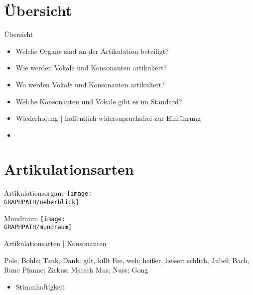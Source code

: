 \section{Übersicht}

\begin{frame}
  {Übersicht}
  \pause
  \begin{itemize}[<+->]
    \item Welche \alert{Organe} sind an der Artikulation beteiligt?
    \item \alert{Wie} werden Vokale und Konsonanten artikuliert?
    \item \alert{Wo} werden Vokale und Konsonanten artikuliert?
    \item Welche Konsonanten und Vokale gibt es im \alert{Standard}?
      \Zeile
    \item Wiederholung | hoffentlich widersupruchsfrei zur Einführung 
    \item \citet[Kap.~4]{Schaefer2018b}
  \end{itemize}
\end{frame}

\section{Artikulationsarten}

\begin{frame}
  {Artikulationsorgane}
  \pause
  \centering
  \texttt{[image: \\GRAPHPATH/ueberblick]}
\end{frame}

\begin{frame}
  {Mundraum}
  \pause
  \centering
  \texttt{[image: \\GRAPHPATH/mundraum]}
\end{frame}

\begin{frame}
  {Artikulationsarten | Konsonanten}
  \pause
    \begin{exe}
      \ex \alert{P}ole, \alert{B}ohle; \alert{T}ank, \alert{D}ank; \alert{g}ilt, \alert{k}illt
      \pause
      \ex \alert{F}ee, \alert{w}eh; hei\alert{ß}er, hei\alert{s}er; schli\alert{ch}, \alert{J}ubel; Ba\alert{ch}, \alert{R}une
      \pause
      \ex \alert{Pf}anne; \alert{Z}irkus; Ma\alert{tsch}
      \pause
      \ex \alert{M}us; \alert{N}uss; Go\alert{ng}
    \end{exe}
    \pause
    \Large
    \begin{itemize}
      \item \alert{Stimmhaftigkeit}
    \end{itemize}
\end{frame}


